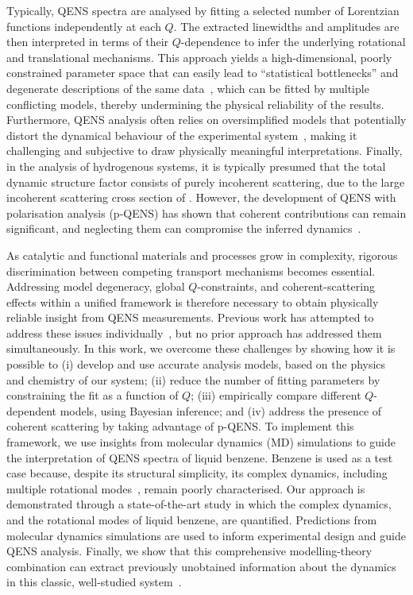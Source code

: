 \documentclass[reprint,
               superscriptaddress,
               nobibnotes,
               amsmath,
               amssymb,
               aps,
               hidelinks, 
               pre]{revtex4-2}
\begin{document}
Typically, QENS spectra are analysed by fitting a selected number of Lorentzian functions independently at each $Q$. The extracted linewidths and amplitudes are then interpreted in terms of their $Q$-dependence to infer the underlying rotational and translational mechanisms.
This approach yields a high-dimensional, poorly constrained parameter space that can easily lead to ``statistical bottlenecks'' and degenerate descriptions of the same data~\cite{Mamontov2019}, which can be fitted by multiple conflicting models, thereby undermining the physical reliability of the results. 
Furthermore, QENS analysis often relies on oversimplified models that potentially distort the dynamical behaviour of the experimental system~\cite{Hernandez2021}, making it challenging and subjective to draw physically meaningful interpretations.
Finally, in the analysis of hydrogenous systems, it is typically presumed that the total dynamic structure factor consists of purely incoherent scattering, due to the large incoherent scattering cross section of . 
However, the development of QENS with polarisation analysis (p-QENS) has shown that coherent contributions can remain significant, and neglecting them can compromise the inferred dynamics~\cite{Sarter2024}.

As catalytic and functional materials and processes grow in complexity, rigorous discrimination between competing transport mechanisms becomes essential. 
Addressing model degeneracy, global $Q$-constraints, and coherent-scattering effects within a unified framework is therefore necessary to obtain physically reliable insight from QENS measurements.
Previous work has attempted to address these issues individually~\cite{Arbe2020, Jobic2000, Sivia1992, Voneshen2017}, but no prior approach has addressed them simultaneously. 
In this work, we overcome these challenges by showing how it is possible to (i) develop and use accurate analysis models, based on the physics and chemistry of our system; (ii) reduce the number of fitting parameters by constraining the fit as a function of $Q$; (iii) empirically compare different $Q$-dependent models, using Bayesian inference; and (iv) address the presence of coherent scattering by taking advantage of p-QENS.
To implement this framework, we use insights from molecular dynamics (MD) simulations to guide the interpretation of QENS spectra of liquid benzene.
Benzene is used as a test case because, despite its structural simplicity, its complex dynamics, including multiple rotational modes~\cite{Gillen1972, Rothschild2012}, remain poorly characterised.
Our approach is demonstrated through a state-of-the-art study in which the complex dynamics, and the rotational modes of liquid benzene, are quantified. 
Predictions from molecular dynamics simulations are used to inform experimental design and guide QENS analysis. 
Finally, we show that this comprehensive modelling-theory combination can extract previously unobtained information about the dynamics in this classic, well-studied system~\cite{Kikuchi2023}.
\end{document}
